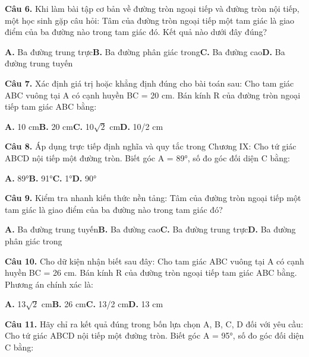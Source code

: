\documentclass[11pt,a4paper]{article}
\begin{document}
\textbf{\color{primary} Câu 6.} Khi làm bài tập cơ bản về đường tròn ngoại tiếp và đường tròn nội tiếp, một học sinh gặp câu hỏi: Tâm của đường tròn ngoại tiếp một tam giác là giao điểm của ba đường nào trong tam giác đó. Kết quả nào dưới đây đúng?\par
\hspace*{1.5em}\textbf{A.} Ba đường trung trực\quad\quad \textbf{B.} Ba đường phân giác trong\quad\quad \textbf{C.} Ba đường cao\quad\quad \textbf{D.} Ba đường trung tuyến\par\vspace{2pt}
\textbf{\color{primary} Câu 7.} Xác định giá trị hoặc khẳng định đúng cho bài toán sau: Cho tam giác ABC vuông tại A có cạnh huyền BC = 20 cm. Bán kính R của đường tròn ngoại tiếp tam giác ABC bằng:\par
\hspace*{1.5em}\textbf{A.} 10 cm\quad\quad \textbf{B.} 20 cm\quad\quad \textbf{C.} 10$\sqrt{2}$ cm\quad\quad \textbf{D.} 10/2 cm\par\vspace{2pt}
\textbf{\color{primary} Câu 8.} Áp dụng trực tiếp định nghĩa và quy tắc trong Chương IX: Cho tứ giác ABCD nội tiếp một đường tròn. Biết góc A = 89°, số đo góc đối diện C bằng:\par
\hspace*{1.5em}\textbf{A.} 89°\quad\quad \textbf{B.} 91°\quad\quad \textbf{C.} 1°\quad\quad \textbf{D.} 90°\par\vspace{2pt}
\textbf{\color{primary} Câu 9.} Kiểm tra nhanh kiến thức nền tảng: Tâm của đường tròn ngoại tiếp một tam giác là giao điểm của ba đường nào trong tam giác đó?\par
\hspace*{1.5em}\textbf{A.} Ba đường trung tuyến\quad\quad \textbf{B.} Ba đường cao\quad\quad \textbf{C.} Ba đường trung trực\quad\quad \textbf{D.} Ba đường phân giác trong\par\vspace{2pt}
\textbf{\color{primary} Câu 10.} Cho dữ kiện nhận biết sau đây: Cho tam giác ABC vuông tại A có cạnh huyền BC = 26 cm. Bán kính R của đường tròn ngoại tiếp tam giác ABC bằng. Phương án chính xác là:\par
\hspace*{1.5em}\textbf{A.} 13$\sqrt{2}$ cm\quad\quad \textbf{B.} 26 cm\quad\quad \textbf{C.} 13/2 cm\quad\quad \textbf{D.} 13 cm\par\vspace{2pt}
\textbf{\color{primary} Câu 11.} Hãy chỉ ra kết quả đúng trong bốn lựa chọn A, B, C, D đối với yêu cầu: Cho tứ giác ABCD nội tiếp một đường tròn. Biết góc A = 95°, số đo góc đối diện C bằng:\par
\end{document}
